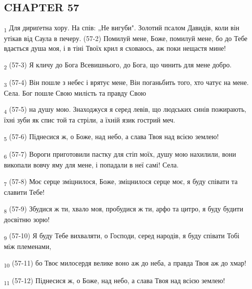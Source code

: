 \subsection{CHAPTER 57}
\begin{tcolorbox}
\textsubscript{1} Для дириґетна хору. На спів: „Не вигуби". Золотий псалом Давидів, коли він утікав від Саула в печеру. (57-2) Помилуй мене, Боже, помилуй мене, бо до Тебе вдається душа моя, і в тіні Твоїх крил я сховаюсь, аж поки нещастя мине!
\end{tcolorbox}
\begin{tcolorbox}
\textsubscript{2} (57-3) Я кличу до Бога Всевишнього, до Бога, що чинить для мене добро.
\end{tcolorbox}
\begin{tcolorbox}
\textsubscript{3} (57-4) Він пошле з небес і врятує мене, Він поганьбить того, хто чатує на мене. Села. Бог пошле Свою милість та правду Свою
\end{tcolorbox}
\begin{tcolorbox}
\textsubscript{4} (57-5) на душу мою. Знаходжуся я серед левів, що людських синів пожирають, їхні зуби як спис той та стріли, а їхній язик гострий меч.
\end{tcolorbox}
\begin{tcolorbox}
\textsubscript{5} (57-6) Піднесися ж, о Боже, над небо, а слава Твоя над всією землею!
\end{tcolorbox}
\begin{tcolorbox}
\textsubscript{6} (57-7) Вороги приготовили пастку для стіп моїх, душу мою нахилили, вони викопали вовчу яму для мене, і попадали в неї самі! Села.
\end{tcolorbox}
\begin{tcolorbox}
\textsubscript{7} (57-8) Моє серце зміцнилося, Боже, зміцнилося серце моє, я буду співати та славити Тебе!
\end{tcolorbox}
\begin{tcolorbox}
\textsubscript{8} (57-9) Збудися ж ти, хвало моя, пробудися ж ти, арфо та цитро, я буду будити досвітню зорю!
\end{tcolorbox}
\begin{tcolorbox}
\textsubscript{9} (57-10) Я буду Тебе вихваляти, о Господи, серед народів, я буду співати Тобі між племенами,
\end{tcolorbox}
\begin{tcolorbox}
\textsubscript{10} (57-11) бо Твоє милосердя велике воно аж до неба, а правда Твоя аж до хмар!
\end{tcolorbox}
\begin{tcolorbox}
\textsubscript{11} (57-12) Піднесися ж, о Боже, над небо, а слава Твоя над всією землею!
\end{tcolorbox}
